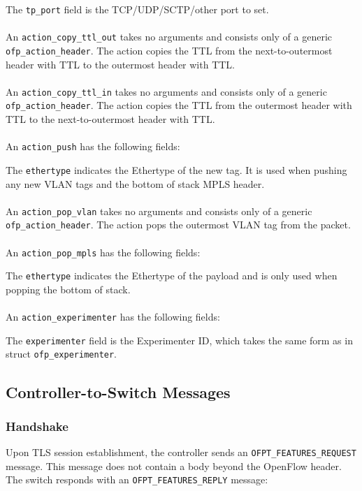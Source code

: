 
The \verb|tp_port| field is the TCP/UDP/SCTP/other port to set.
\\\\
An \verb|action_copy_ttl_out| takes no arguments and consists only of a generic \verb|ofp_action_header|. The action copies the TTL from the next-to-outermost header with TTL to the outermost header with TTL.
\\\\
An \verb|action_copy_ttl_in| takes no arguments and consists only of a generic \verb|ofp_action_header|. The action copies the TTL from the outermost header with TTL to the next-to-outermost header with TTL.
\\\\
An \verb|action_push| has the following fields:


The \verb|ethertype| indicates the Ethertype of the new tag. It is used when pushing any new VLAN tags and the bottom of stack MPLS header.
\\\\
An \verb|action_pop_vlan| takes no arguments and consists only of a generic \verb|ofp_action_header|. The action pops the outermost VLAN tag from the packet.
\\\\
An \verb|action_pop_mpls| has the following fields:


The \verb|ethertype| indicates the Ethertype of the payload and is only used when popping the bottom of stack.
\\\\
An \verb|action_experimenter| has the following fields:


The \verb|experimenter| field is the Experimenter ID, which takes the same form as in struct \verb|ofp_experimenter|.

\subsection{Controller-to-Switch Messages}

\subsubsection{Handshake}
\label{cts:handshake} 
Upon TLS session establishment, the controller sends an \verb|OFPT_FEATURES_REQUEST| message.  This message does not contain a body beyond the OpenFlow header.  The switch responds with an \verb|OFPT_FEATURES_REPLY| message:

